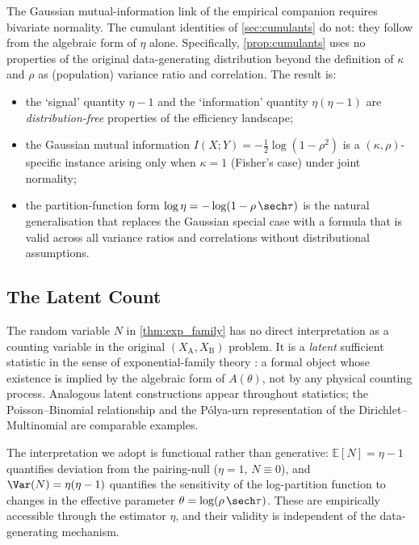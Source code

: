 The Gaussian mutual-information link of the empirical companion \parencite{brownPEFempirical} requires bivariate normality.  The cumulant identities of \cref{sec:cumulants} do not: they follow from the algebraic form of $\eta$ alone.  Specifically, \cref{prop:cumulants} uses no properties of the original data-generating distribution beyond the definition of $\kappa$ and $\rho$ as (population) variance ratio and correlation.  The result is:
\begin{itemize}
  \item the `signal' quantity $\eta-1$ and the `information' quantity $\eta(\eta-1)$ are \emph{distribution-free} properties of the efficiency landscape;
  \item the Gaussian mutual information $I(X;Y) = -\tfrac{1}{2}\log(1-\rho^{2})$ is a $(\kappa,\rho)$-specific instance arising only when $\kappa = 1$ (Fisher's case) under joint normality;
  \item the partition-function form $\log\eta = -\log(1-\rho\,\sech\tau)$ is the natural generalisation that replaces the Gaussian special case with a formula that is valid across all variance ratios and correlations without distributional assumptions.
\end{itemize}

\subsection{The Latent Count}
\label{sec:latent_count}

The random variable $N$ in \cref{thm:exp_family} has no direct interpretation as a counting variable in the original $(X_{\mathrm{A}},X_{\mathrm{B}})$ problem.  It is a \emph{latent} sufficient statistic in the sense of exponential-family theory \parencite{brown1986,coverThomas2006}: a formal object whose existence is implied by the algebraic form of $A(\theta)$, not by any physical counting process.  Analogous latent constructions appear throughout statistics; the Poisson--Binomial relationship and the Pólya-urn representation of the Dirichlet--Multinomial are comparable examples.

The interpretation we adopt is functional rather than generative: $\mathbb{E}[N] = \eta - 1$ quantifies deviation from the pairing-null ($\eta = 1$, $N \equiv 0$), and $\Var(N) = \eta(\eta-1)$ quantifies the sensitivity of the log-partition function to changes in the effective parameter $\theta = \log(\rho\,\sech\tau)$.  These are empirically accessible through the estimator $\hat{\eta}$, and their validity is independent of the data-generating mechanism.
